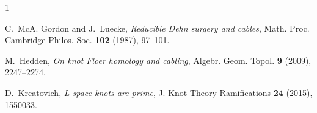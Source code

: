 \documentclass[12pt]{article}
\begin{document}
\begin{thebibliography}{1}

C.~McA. Gordon and J.~Luecke,
\textit{Reducible Dehn surgery and cables},
Math. Proc. Cambridge Philos. Soc. \textbf{102} (1987), 97--101.

M.~Hedden,
\textit{On knot Floer homology and cabling},
Algebr. Geom. Topol. \textbf{9} (2009), 2247--2274.

D.~Krcatovich,
\textit{L-space knots are prime},
J. Knot Theory Ramifications \textbf{24} (2015), 1550033.

\end{thebibliography}
\end{document}
